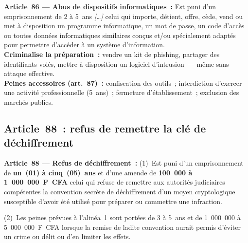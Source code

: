\begin{boxjuris}
\textbf{Article~86 --- Abus de dispositifs informatiques~:}
Est puni d'un emprisonnement de 2 à 5~ans \textit{[\ldots]} celui qui
importe, détient, offre, cède, vend ou met à disposition un programme
informatique, un mot de passe, un code d'accès ou toutes données
informatiques similaires conçus et/ou spécialement adaptés pour permettre
d'accéder à un système d'information.\\[0.3ex]
\textbf{Criminalise la préparation~:} vendre un kit de phishing, partager
des identifiants volés, mettre à disposition un logiciel d'intrusion~---
même sans attaque effective.\\[0.3ex]
\textbf{Peines accessoires (art.~87)~:} confiscation des outils~;
interdiction d'exercer une activité professionnelle (5~ans)~;
fermeture d'établissement~; exclusion des marchés publics.
\end{boxjuris}

\subsection{Article~88~: refus de remettre la clé de déchiffrement}

\begin{boxjuris}
\textbf{Article~88 --- Refus de déchiffrement~:}
(1)~Est puni d'un emprisonnement de \textbf{un~(01) à cinq~(05)~ans} et
d'une amende de \textbf{100~000 à 1~000~000~F~CFA} celui qui refuse de
remettre aux autorités judiciaires compétentes la convention secrète de
déchiffrement d'un moyen cryptologique susceptible d'avoir été utilisé
pour préparer ou commettre une infraction.

(2)~Les peines prévues à l'alinéa~1 sont portées de 3 à 5~ans et de
1~000~000 à 5~000~000~F~CFA lorsque la remise de ladite convention aurait
permis d'éviter un crime ou délit ou d'en limiter les effets.
\end{boxjuris}

